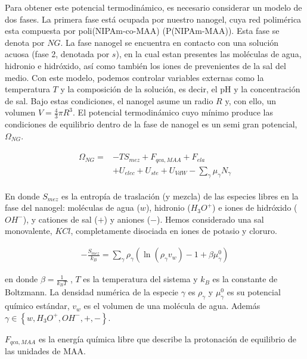 	Para obtener este potencial termodin\'amico, es necesario considerar un modelo de dos fases. La primera fase est\'a ocupada por nuestro nanogel, cuya red polim\'erica esta compuesta por poli(NIPAm-co-MAA) (P(NIPAm-MAA)). Esta fase se denota por $NG$. La fase nanogel se encuentra en contacto con una soluci\'on acuosa (fase 2, denotada por $s$), en la cual estan presentes las mol\'eculas de agua, hidronio e hidr\'oxido, as\'i como tambi\'en los iones de prevenientes de la sal del medio.
	Con este modelo, podemos controlar variables externas como la temperatura $T$ y la composici\'on de la soluci\'on, es decir, el pH y la concentraci\'on de sal. Bajo estas condiciones, el nanogel asume un radio $R$ y, con ello, un volumen $V=\frac{4}{3}\pi R^3$.
	El potencial termodin\'amico cuyo m\'inimo produce las condiciones de equilibrio dentro de la fase de nanogel es un semi gran potencial, $\Omega_{NG}$.
	
	
	
	\begin{align}
		\begin{aligned}
			\Omega_{NG}=& -TS_{mez} + F_{qca,MAA} +  F_{ela}\\
			& + U_{elec}+  U_{ste} + U_{VdW} -{\sum_{\gamma}
				{\mu_\gamma N_\gamma}}
		\end{aligned}
		\label{eq:mc:free-energy-implicit}
	\end{align}
	
	
	\noindent En donde $S_{mez}$ es la entrop\'ia de traslaci\'on (y mezcla) de las especies libres en la fase del nanogel: mol\'eculas de agua ($w$), hidronio ($H_3O^+$) e iones de hidr\'oxido ($OH^-$), y cationes de sal ($+$) y aniones ($-$).
	Hemos considerado una sal monovalente, $KCl$,  completamente disociada en iones de potasio y cloruro.
	
	\begin{align}
		-\frac{S_{mez}}{k_B}	= \sum_{\gamma} \rho_\gamma\left(\ln\left(\rho_\gamma v_w\right) -1 + \beta\mu^0_\gamma\right) 
	\end{align}
	
	\noindent en donde  $\beta=\frac{1}{k_BT}$ , $T$ es la temperatura del sistema  y  $k_B$ es la constante de Boltzmann. La densidad num\'erica de la especie $\gamma$ es $\rho_\gamma$ y $\mu^0_\gamma$ es su potencial qu\'imico est\'andar,  $v_w$ es el volumen de una mol\'ecula de agua. Adem\'as $\gamma \in \left\{ w, H_3O^+, OH^-, +,- \right\}$.
	
	$F_{qca,MAA}$ es la energ\'ia qu\'imica libre que describe la protonaci\'on de equilibrio de las unidades de MAA.
	
